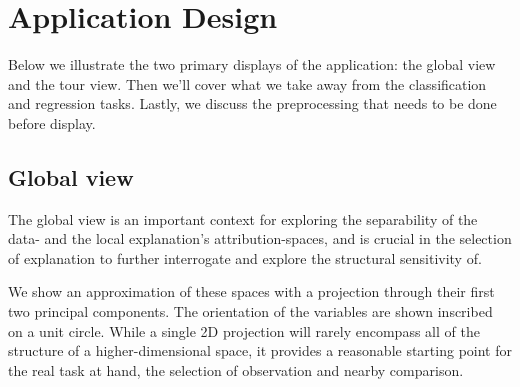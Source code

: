 \documentclass[
]{article}
\begin{document}
\hypertarget{sec:applicationdesign}{%
\section{Application Design}\label{sec:applicationdesign}}

Below we illustrate the two primary displays of the application: the global view and the tour view. Then we'll cover what we take away from the classification and regression tasks. Lastly, we discuss the preprocessing that needs to be done before display.

\hypertarget{global-view}{%
\subsection{Global view}\label{global-view}}

The global view is an important context for exploring the separability of the data- and the local explanation's attribution-spaces, and is crucial in the selection of explanation to further interrogate and explore the structural sensitivity of.

We show an approximation of these spaces with a projection through their first two principal components. The orientation of the variables are shown inscribed on a unit circle. While a single 2D projection will rarely encompass all of the structure of a higher-dimensional space, it provides a reasonable starting point for the real task at hand, the selection of observation and nearby comparison.
\end{document}
